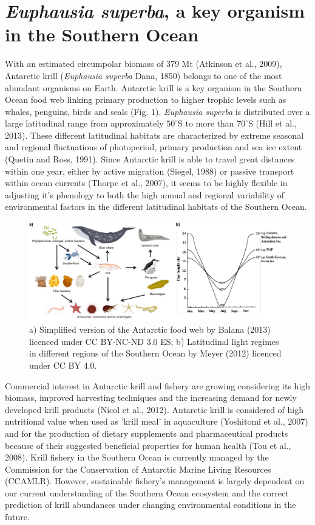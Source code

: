 \section*{\textit{Euphausia superba}, a key organism in the Southern Ocean}
With an estimated circumpolar biomass of 379 Mt (Atkinson et al., 2009),
Antarctic krill (\textit{Euphausia superba} Dana, 1850) belongs to one of the
most abundant organisms on Earth. Antarctic krill is a key organism in the
Southern Ocean food web linking primary production to higher trophic levels
such as whales, penguins, birds and seals (Fig. 1). \textit{Euphausia superba}
is distributed over a large latitudinal range from approximately $50^{\circ}$S
to more than $70^{\circ}$S (Hill et al., 2013). These different latitudinal
habitats are characterized by extreme seasonal and regional fluctuations of
photoperiod, primary production and sea ice extent (Quetin and Ross, 1991).
Since Antarctic krill is able to travel great distances within one year, either
by active migration (Siegel, 1988) or passive transport within ocean currents
(Thorpe et al., 2007), it seems to be highly flexible in adjusting it's
phenology to both the high annual and regional variability of environmental
factors in the different latitudinal habitats of the Southern Ocean. 


\begin{figure}
        \caption{a) Simplified version of the Antarctic food web by Balana
        (2013) licenced under CC BY-NC-ND 3.0 ES; b) Latitudinal light regimes
        in different regions of the Southern Ocean by Meyer (2012) licenced
        under CC BY 4.0.}
        \centering
        \includegraphics[width=0.85\pagewidth]{../Figures/Figure1.pdf}
\end{figure}


Commercial interest in Antarctic krill and fishery are growing considering its
high biomass, improved harvesting techniques and the increasing demand for
newly developed krill products (Nicol et al., 2012). Antarctic krill is
considered of high nutritional value when used as 'krill meal' in aquaculture
(Yoshitomi et al., 2007) and for the production of dietary supplements and
pharmaceutical products because of their suggested beneficial properties for
human health (Tou et al., 2008). Krill fishery in the Southern Ocean is
currently managed by the Commission for the Conservation of Antarctic Marine
Living Resources (CCAMLR). However, sustainable fishery's management is largely
dependent on our current understanding of the Southern Ocean ecosystem and the
correct prediction of krill abundances under changing environmental conditions
in the future. 

